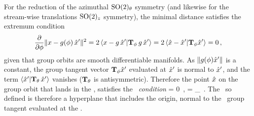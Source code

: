 For the reduction of the azimuthal
$\textrm{SO}(2)_\theta$ symmetry (and likewise for the stream-wise translations
$\textrm{SO}(2)_z$ symmetry), the minimal distance satisfies the extremum
condition
\[
\frac{\partial}{\partial \gSpace} \Norm{\ssp - \LieEl(\gSpace)\,\slicep}^2
   =
2\, \braket{\ssp - \LieEl\,\slicep}{\Lg_\gSpace \,\LieEl\,\slicep}
   =
2\, \braket{\sspRed - \slicep}{\Lg_\gSpace \slicep}
   = 0
    \, ,
\]
given that group orbits are smooth differentiable manifolds.
As $\|{g({\bf \phi}){\hat{x}'}}\|$ is a constant,
the group tangent vector $\mathbf{T}_{{\bf \phi}} {\hat{x}'}$
evaluated at ${\hat{x}'}$
is normal to ${\hat{x}'}$, and
the term $\braket{\slicep}{\Lg_\theta\,\slicep}$ vanishes
($\mathbf{T}_{\theta}$ is antisymmetric).
Therefore the point $\hat{x}$ on the group
orbit that lands in the \slice, satisfies the \emph{\slice\ condition}
\beq
\braket{\sspRed}{\sliceTan{\theta}} = 0
    \,,\quad
\sliceTan{\theta} = \Lg_\theta \slicep
    \,.
The \slice\ so defined is therefore
a hyperplane that includes the origin,
normal to the \template\ group tangent %
evaluated at the \template.


